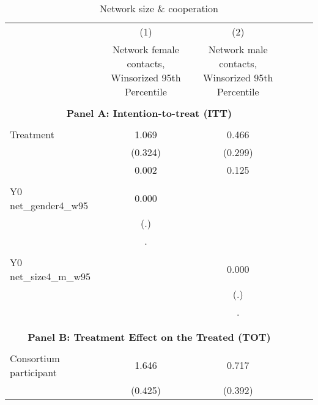 \begin{table}[!h] \centering \\ \caption{Network size & cooperation} \\ \begin{adjustbox}{width=\columnwidth,center} \\ \begin{tabular}{l*{5}{c}} \hline\hline
                    &\multicolumn{1}{c}{(1)}         &\multicolumn{1}{c}{(2)}         \\
                    &Network female contacts, Winsorized 95th Percentile         &Network male contacts, Winsorized 95th Percentile         \\
\hline \\ \multicolumn{4}{c}{\textbf{Panel A: Intention-to-treat (ITT)}} \\\\[-1ex]
Treatment           &       1.069\sym{***}&       0.466         \\
                    &     (0.324)         &     (0.299)         \\
                    &       0.002         &       0.125         \\
                    &                     &                     \\
Y0 net\_gender4\_w95  &       0.000         &                     \\
                    &         (.)         &                     \\
                    &           .         &                     \\
                    &                     &                     \\
Y0 net\_size4\_m\_w95  &                     &       0.000         \\
                    &                     &         (.)         \\
                    &                     &           .         \\
                    &                     &                     \\
\hline \\ \multicolumn{4}{c}{\textbf{Panel B: Treatment Effect on the Treated (TOT)}} \\\\[-1ex]
Consortium participant&       1.646\sym{***}&       0.717\sym{*}  \\
                    &     (0.425)         &     (0.392)         \\

\end{tabular}
\end{adjustbox}
\end{table}
